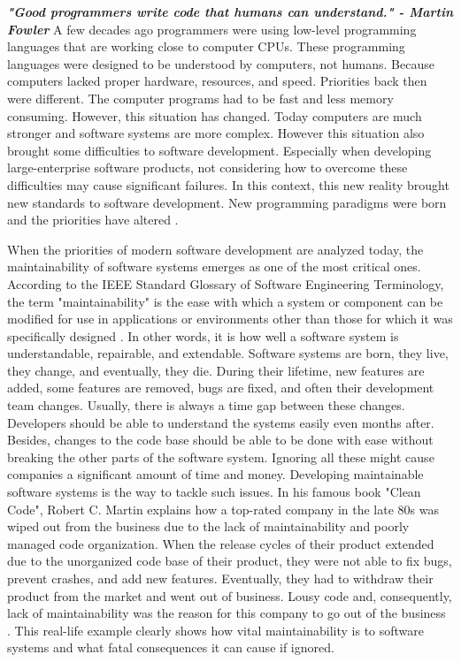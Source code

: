 \textbf{\textit{"Good programmers write code that humans can understand." - Martin Fowler}} \cite{21}
A few decades ago programmers were using low-level programming languages that are working close to computer CPUs. These programming languages were designed to be understood by computers, not humans. Because computers lacked proper hardware, resources, and speed. Priorities back then were different. The computer programs had to be fast and less memory consuming. However, this situation has changed. Today computers are much stronger and software systems are more complex. However this situation also brought some difficulties to software development. Especially when developing large-enterprise software products, not considering how to overcome these difficulties may cause significant failures. In this context,  this new reality brought new standards to software development. New programming paradigms were born and the priorities have altered \cite{12}.

When the priorities of modern software development are analyzed today, the maintainability of software systems emerges as one of the most critical ones. According to the IEEE Standard Glossary of Software Engineering Terminology, the term "maintainability" is the ease with which a system or component can be modified for use in applications or environments other than those for which it was specifically designed \cite{20}. In other words, it is how well a software system is understandable, repairable, and extendable. Software systems are born, they live, they change, and eventually, they die. During their lifetime, new features are added, some features are removed, bugs are fixed, and often their development team changes. Usually, there is always a time gap between these changes. Developers should be able to understand the systems easily even months after. Besides, changes to the code base should be able to be done with ease without breaking the other parts of the software system. Ignoring all these might cause companies a significant amount of time and money. Developing maintainable software systems is the way to tackle such issues. In his famous book "Clean Code", Robert C. Martin explains how a top-rated company in the late 80s was wiped out from the business due to the lack of maintainability and poorly managed code organization. When the release cycles of their product extended due to the unorganized code base of their product, they were not able to fix bugs, prevent crashes, and add new features. Eventually, they had to withdraw their product from the market and went out of business. Lousy code and, consequently, lack of maintainability was the reason for this company to go out of the business \cite{11}. This real-life example clearly shows how vital maintainability is to software systems and what fatal consequences it can cause if ignored. 

